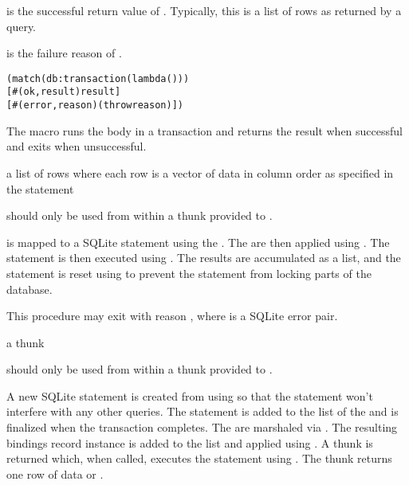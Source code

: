  is the successful return value of . Typically,
this is a list of rows as returned by a  query.

 is the failure reason of .

\begin{syntax}
\end{syntax}
\expandsto{} \antipar\begin{alltt}
(match (db:transaction  (lambda ()  \etc))
  [#(ok ,result) result]
  [#(error ,reason) (throw reason)])
\end{alltt}

The  macro runs the body in a transaction and
returns the result when successful and exits when unsuccessful.

\begin{procedure}
\end{procedure}
\returns{}
a list of rows where each row is a vector of data in column order as
specified in the  statement

 should only be used from within a thunk 
provided to .

 is mapped to a SQLite statement using the
. The  are then applied using
. The statement is then executed using
. The results are accumulated as a list, and the
statement is reset using  to prevent the
statement from locking parts of the database.

This procedure may exit with reason , where  is a SQLite error pair.

\begin{procedure}
\end{procedure}
\returns{}
a thunk

 should only be used from within a thunk 
provided to .

A new SQLite statement is created from  using
 so that the statement won't interfere with
any other queries. The statement is added to the
 list of the  and is
finalized when the transaction completes.  The  are marshaled
via . The resulting bindings record instance
is added to the  list and applied
using . A thunk is returned which, when
called, executes the statement using . The thunk
returns one row of data or .

